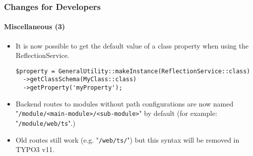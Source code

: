 \begin{frame}[fragile]
	\frametitle{Changes for Developers}
	\framesubtitle{Miscellaneous (3)}

	\lstset{basicstyle=\tiny\ttfamily}

	\begin{itemize}
		\item It is now possible to get the default value of a class property
			when using the ReflectionService.

\begin{lstlisting}
$property = GeneralUtility::makeInstance(ReflectionService::class)
  ->getClassSchema(MyClass::class)
  ->getProperty('myProperty');
\end{lstlisting}

		\item Backend routes to modules without path configurations are now named\newline
			"\texttt{/module/<main-module>/<sub-module>}" by default\newline
			\small
				(for example: "\texttt{/module/web/ts}".)
			\normalsize

		\item Old routes still work (e.g. "\texttt{/web/ts/}") but this syntax will be removed in TYPO3 v11.

	\end{itemize}

\end{frame}


